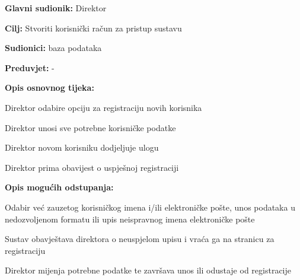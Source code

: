 						\noindent {}
					\begin{packed_item}
						
						\item \textbf{Glavni sudionik: } Direktor
						\item  \textbf{Cilj:} Stvoriti korisnički račun za pristup sustavu
						\item  \textbf{Sudionici:} baza podataka
						\item  \textbf{Preduvjet:} -
						\item  \textbf{Opis osnovnog tijeka:}
						
						\item[] \begin{packed_enum}
							\item Direktor odabire opciju za registraciju novih korisnika
							\item Direktor unosi sve potrebne korisničke podatke
							\item Direktor novom korisniku dodjeljuje ulogu
							\item Direktor prima obavijest o uspješnoj registraciji
						\end{packed_enum}
						
						\item  \textbf{Opis mogućih odstupanja:}
						\item[] \begin{packed_item}
							\item[2.a] Odabir već zauzetog korisničkog imena i/ili elektroničke pošte, unos podataka u nedozvoljenom formatu ili upis neispravnog imena elektroničke pošte
							\item[] \begin{packed_enum}
								\item Sustav obavještava direktora o neuspjelom upisu i vraća ga na stranicu za registraciju
								\item Direktor mijenja potrebne podatke te završava unos ili odustaje od registracije
								
							\end{packed_enum}
						\end{packed_item}
					\end{packed_item}
					\noindent {}
